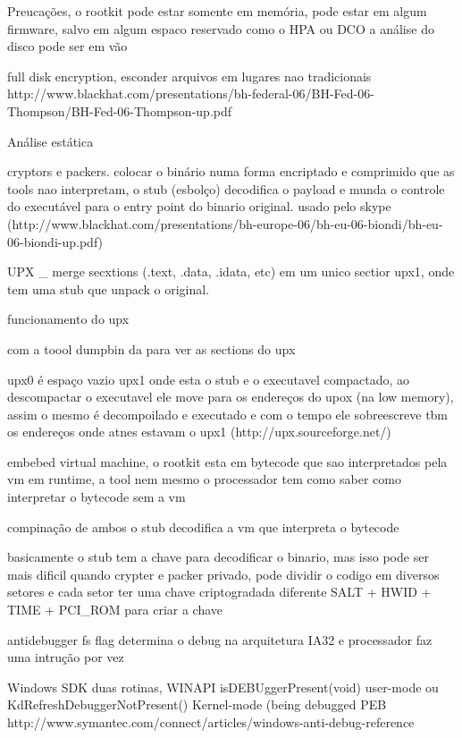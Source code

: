 Preucações, o rootkit pode estar somente em memória, pode estar em algum firmware, salvo em algum espaco reservado como o HPA ou DCO a análise do disco pode ser em vão

full disk encryption, esconder arquivos em lugares nao tradicionais http://www.blackhat.com/presentations/bh-federal-06/BH-Fed-06-Thompson/BH-Fed-06-Thompson-up.pdf


Análise estática

cryptors e packers. colocar o binário numa forma encriptado e comprimido que as tools nao interpretam, o stub (esbolço) decodifica o payload e munda o controle do executável para o entry point do binario original. usado pelo skype (http://www.blackhat.com/presentations/bh-europe-06/bh-eu-06-biondi/bh-eu-06-biondi-up.pdf) 

UPX _ merge secxtions (.text, .data, .idata, etc) em um unico sectior upx1, onde tem uma stub que unpack o original.


funcionamento do upx

com a toool dumpbin da para ver as sections do upx

upx0 é espaço vazio
upx1 onde esta o stub e o executavel compactado, ao descompactar o executavel ele move para os endereços do upox (na low memory), assim o mesmo é decompoilado e executado e com o tempo ele sobreescreve tbm os endereços onde atnes estavam o upx1 (http://upx.sourceforge.net/)

embebed virtual machine, o rootkit esta em bytecode que sao interpretados pela vm em runtime, a tool nem mesmo o processador tem como saber como interpretar o bytecode sem a vm

compinação de ambos o stub decodifica a vm que interpreta o bytecode


basicamente o stub tem a chave para decodificar o binario, mas isso pode ser mais dificil quando crypter e packer privado, pode dividir o codigo em diversos setores e cada setor ter uma chave criptogradada diferente SALT + HWID + TIME + PCI_ROM para criar a chave


antidebugger fs flag determina o debug na arquitetura IA32 e processador faz uma intrução por vez


Windows SDK duas rotinas, WINAPI isDEBUggerPresent(void) user-mode ou KdRefreshDebuggerNotPresent() Kernel-mode (being debugged PEB http://www.symantec.com/connect/articles/windows-anti-debug-reference











